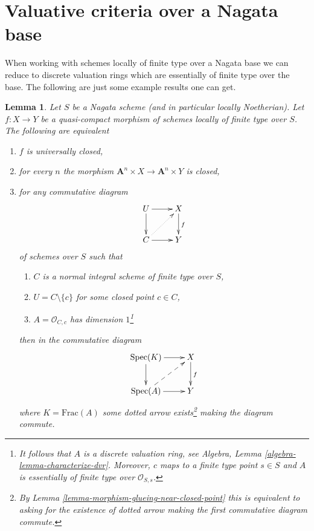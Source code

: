 \documentclass{stacks-project}
\theoremstyle{plain}
\newtheorem{lemma}[subsection]{Lemma}
\theoremstyle{definition}
\theoremstyle{remark}
\numberwithin{equation}{subsection}
\def\Spec{\mathop{\mathrm{Spec}}}
\begin{document}
\section{Valuative criteria over a Nagata base}
\label{section-nagata-valuative}

\noindent
When working with schemes locally of finite type over a
Nagata base we can reduce to discrete valuation rings
which are essentially of finite type over the base.
The following are just some example results one can get.

\begin{lemma}
\label{lemma-essentially-finite-type-criterion-universally-closed}
Let $S$ be a Nagata scheme (and in particular locally Noetherian).
Let $f : X \to Y$ be a quasi-compact morphism of schemes locally
of finite type over $S$. The following are equivalent
\begin{enumerate}
\item $f$ is universally closed,
\item for every $n$ the morphism
$\mathbf{A}^n \times X \to \mathbf{A}^n \times Y$ is closed,
\item for any commutative diagram
$$
\xymatrix{
U \ar[r] \ar[d] & X \ar[d]^f \\
C \ar[r] \ar@{..>}[ru] & Y
}
$$
of schemes over $S$ such that
\begin{enumerate}
\item $C$ is a normal integral scheme of finite type over $S$,
\item $U = C \setminus \{c\}$ for some closed point $c \in C$,
\item $A = \mathcal{O}_{C, c}$ has dimension $1$\footnote{It follows
that $A$ is a discrete valuation ring, see
Algebra, Lemma \ref{algebra-lemma-characterize-dvr}.
Moreover, $c$ maps to a finite type point $s \in S$ and
$A$ is essentially of finite type over $\mathcal{O}_{S, s}$.}
\end{enumerate}
then in the commutative diagram
$$
\xymatrix{
\Spec(K) \ar[r] \ar[d] & X \ar[d]^f \\
\Spec(A) \ar[r] \ar@{-->}[ru] & Y
}
$$
where $K = \text{Frac}(A)$ some dotted arrow exists\footnote{By
Lemma \ref{lemma-morphism-glueing-near-closed-point} this is
equivalent to asking for the existence of dotted arrow
making the first commutative diagram commute.}
making the diagram commute.
\end{enumerate}
\end{lemma}
\end{document}
